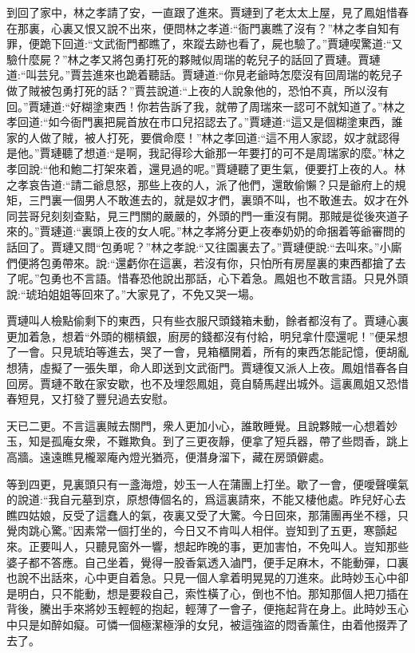 \begin{parag}
    到回了家中，林之孝請了安，一直跟了進來。賈璉到了老太太上屋，見了鳳姐惜春在那裏，心裏又恨又說不出來，便問林之孝道:“衙門裏瞧了沒有？”林之孝自知有罪，便跪下回道:“文武衙門都瞧了，來蹤去跡也看了，屍也驗了。”賈璉喫驚道:“又驗什麼屍？”林之孝又將包勇打死的夥賊似周瑞的乾兒子的話回了賈璉。賈璉道:“叫芸兒。”賈芸進來也跪着聽話。賈璉道:“你見老爺時怎麼沒有回周瑞的乾兒子做了賊被包勇打死的話？”賈芸說道:“上夜的人說象他的，恐怕不真，所以沒有回。”賈璉道:“好糊塗東西！你若告訴了我，就帶了周瑞來一認可不就知道了。”林之孝回道:“如今衙門裏把屍首放在市口兒招認去了。”賈璉道:“這又是個糊塗東西，誰家的人做了賊，被人打死，要償命麼！”林之孝回道:“這不用人家認，奴才就認得是他。”賈璉聽了想道:“是啊，我記得珍大爺那一年要打的可不是周瑞家的麼。”林之孝回說:“他和鮑二打架來着，還見過的呢。”賈璉聽了更生氣，便要打上夜的人。林之孝哀告道:“請二爺息怒，那些上夜的人，派了他們，還敢偷懶？只是爺府上的規矩，三門裏一個男人不敢進去的，就是奴才們，裏頭不叫，也不敢進去。奴才在外同芸哥兒刻刻查點，見三門關的嚴嚴的，外頭的門一重沒有開。那賊是從後夾道子來的。”賈璉道:“裏頭上夜的女人呢。”林之孝將分更上夜奉奶奶的命捆着等爺審問的話回了。賈璉又問“包勇呢？”林之孝說:“又往園裏去了。”賈璉便說:“去叫來。”小廝們便將包勇帶來。說:“還虧你在這裏，若沒有你，只怕所有房屋裏的東西都搶了去了呢。”包勇也不言語。惜春恐他說出那話，心下着急。鳳姐也不敢言語。只見外頭說:“琥珀姐姐等回來了。”大家見了，不免又哭一場。
\end{parag}


\begin{parag}
    賈璉叫人檢點偷剩下的東西，只有些衣服尺頭錢箱未動，餘者都沒有了。賈璉心裏更加着急，想着“外頭的棚槓銀，廚房的錢都沒有付給，明兒拿什麼還呢！”便呆想了一會。只見琥珀等進去，哭了一會，見箱櫃開着，所有的東西怎能記憶，便胡亂想猜，虛擬了一張失單，命人即送到文武衙門。賈璉復又派人上夜。鳳姐惜春各自回房。賈璉不敢在家安歇，也不及埋怨鳳姐，竟自騎馬趕出城外。這裏鳳姐又恐惜春短見，又打發了豐兒過去安慰。
\end{parag}


\begin{parag}
    天已二更。不言這裏賊去關門，衆人更加小心，誰敢睡覺。且說夥賊一心想着妙玉，知是孤庵女衆，不難欺負。到了三更夜靜，便拿了短兵器，帶了些悶香，跳上高牆。遠遠瞧見櫳翠庵內燈光猶亮，便潛身溜下，藏在房頭僻處。
\end{parag}


\begin{parag}
    等到四更，見裏頭只有一盞海燈，妙玉一人在蒲團上打坐。歇了一會，便噯聲嘆氣的說道:“我自元墓到京，原想傳個名的，爲這裏請來，不能又棲他處。昨兒好心去瞧四姑娘，反受了這蠢人的氣，夜裏又受了大驚。今日回來，那蒲團再坐不穩，只覺肉跳心驚。”因素常一個打坐的，今日又不肯叫人相伴。豈知到了五更，寒顫起來。正要叫人，只聽見窗外一響，想起昨晚的事，更加害怕，不免叫人。豈知那些婆子都不答應。自己坐着，覺得一股香氣透入滷門，便手足麻木，不能動彈，口裏也說不出話來，心中更自着急。只見一個人拿着明晃晃的刀進來。此時妙玉心中卻是明白，只不能動，想是要殺自己，索性橫了心，倒也不怕。那知那個人把刀插在背後，騰出手來將妙玉輕輕的抱起，輕薄了一會子，便拖起背在身上。此時妙玉心中只是如醉如癡。可憐一個極潔極淨的女兒，被這強盜的悶香薰住，由着他掇弄了去了。
\end{parag}



